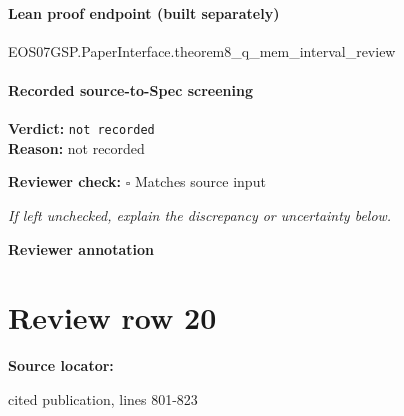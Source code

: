 \documentclass[10pt]{article}
\newcommand{\reviewerbox}{%
  \par\noindent\fbox{\parbox{0.96\linewidth}{\rule{0pt}{0.38in}}}\par
}
\newcommand{\reviewmatch}[1]{%
  \par\noindent\textbf{Reviewer check:} $\square$\; #1\par
  \noindent\emph{If left unchecked, explain the discrepancy or uncertainty below.}\par
}
\begin{document}
\paragraph{Lean proof endpoint (built separately)}\begin{ReviewVerbatim}
EOS07GSP.PaperInterface.theorem8_q_mem_interval_review
\end{ReviewVerbatim}

\paragraph{Recorded source-to-Spec screening}
\textbf{Verdict:} \texttt{not recorded}
\\
\textbf{Reason:} not recorded
\reviewmatch{Matches source input}
\noindent\textbf{Reviewer annotation}\par
\reviewerbox
\clearpage
\hypertarget{source-claim-0138ca35b3951ca7}{}
\section*{Review row 20}
\textbf{Source locator:} {\footnotesize\raggedright cited publication, lines 801-\allowbreak{}823\par}
\end{document}
